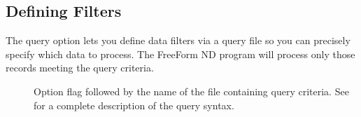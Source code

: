 \subsection{Defining Filters}

The query option lets you define data filters via a query file so you
can precisely specify which data to process. The FreeForm ND program
will process only those records meeting the query criteria.

\begin{description}

\item[\dashq]
  
  Option flag followed by the name of the file containing query
  criteria. See  for a complete description of
  the query syntax.
\end{description}

